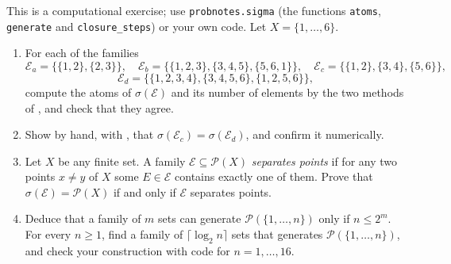 \begin{exercise}\label{ex:sa-computing}
\easy This is a computational exercise; use \texttt{probnotes.sigma} (the functions
\texttt{atoms}, \texttt{generate} and \texttt{closure\_steps}) or your own code. Let
$X=\{1,\dots,6\}$.
\begin{enumerate}[label=(\alph*)]
  \item For each of the families
    \[
      \mathcal E_a=\{\{1,2\},\{2,3\}\},\quad
      \mathcal E_b=\{\{1,2,3\},\{3,4,5\},\{5,6,1\}\},\quad
      \mathcal E_c=\{\{1,2\},\{3,4\},\{5,6\}\},
    \]
    \[
      \mathcal E_d=\{\{1,2,3,4\},\{3,4,5,6\},\{1,2,5,6\}\},
    \]
    compute the atoms of $\sigma(\mathcal E)$ and its number of elements by the two methods of
    , and check that they agree.
  \item Show by hand, with , that
    $\sigma(\mathcal E_c)=\sigma(\mathcal E_d)$, and confirm it numerically.
  \item Let $X$ be any finite set. A family $\mathcal E\subseteq\mathcal P(X)$ \emph{separates
    points} if for any two points $x\ne y$ of $X$ some $E\in\mathcal E$ contains exactly one of
    them. Prove that $\sigma(\mathcal E)=\mathcal P(X)$ if and only if $\mathcal E$ separates
    points.
  \item Deduce that a family of $m$ sets can generate $\mathcal P(\{1,\dots,n\})$ only if
    $n\le2^m$. For every $n\ge1$, find a family of $\lceil\log_2n\rceil$ sets that generates
    $\mathcal P(\{1,\dots,n\})$, and check your construction with code for $n=1,\dots,16$.
\end{enumerate}
\end{exercise}

